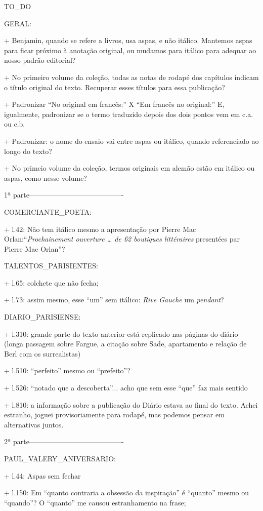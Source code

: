 TO_DO

GERAL:

+ Benjamin, quando se refere a livros, usa aspas, e não itálico. Mantemos aspas para ficar próximo à anotação original, ou mudamos para itálico para adequar ao nosso padrão editorial?

+ No primeiro volume da coleção, todas as notas de rodapé dos capítulos indicam o título original do texto. Recuperar esses títulos para essa publicação?

+ Padronizar ``No original em francês:'' X ``Em francês no original:'' E, igualmente, padronizar se o termo traduzido depois dos dois pontos vem em c.a. ou c.b.

+ Padronizar: o nome do ensaio vai entre aspas ou itálico, quando referenciado ao longo do texto?

+ No primeio volume da coleção, termos originais em alemão estão em itálico ou aspas, como nesse volume?

1ª parte----------------------------------------

COMERCIANTE_POETA:

+ l.42: Não tem itálico mesmo a apresentação por Pierre Mac Orlan:``\emph{Prochainement ouverture \ldots{} de 62 boutiques littéraires} presentées par Pierre Mac Orlan''?

TALENTOS_PARISIENTES:

+ l.65: colchete que não fecha;

+ l.73: assim mesmo, esse ``um'' sem itálico: \emph{Rive Gauche} um \emph{pendant}?

DIARIO_PARISIENSE:

+ l.310: grande parte do texto anterior está replicado nas páginas do diário (longa passagem sobre Fargue, a citação sobre Sade, apartamento e relação de Berl com os surrealistas)

+ l.510: ``perfeito'' mesmo ou ``prefeito''?

+ l.526: ``notado que a descoberta''... acho que sem esse ``que'' faz mais sentido

+ l.810: a informação sobre a publicação do Diário estava ao final do texto. Achei estranho, joguei provisoriamente para rodapé, mas podemos pensar em alternativas juntos.


2ª parte----------------------------------------

PAUL_VALERY_ANIVERSARIO:

+ l.44: Aspas sem fechar

+ l.150: Em ``quanto contraria a obsessão da inspiração'' é ``quanto'' mesmo ou ``quando''? O ``quanto'' me causou estranhamento na frase;

